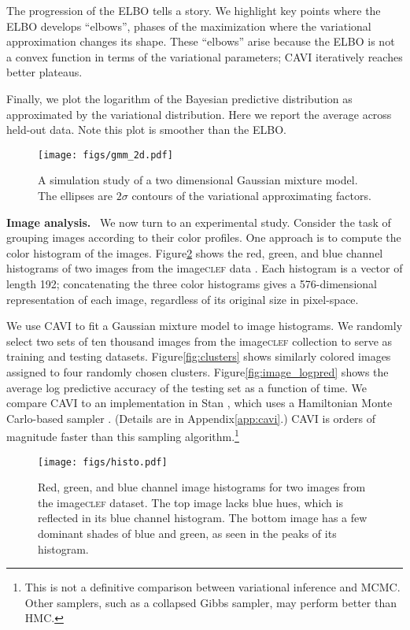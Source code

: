 \documentclass{article}
\DeclareRobustCommand{\parhead}[1]{\textbf{#1}~}
\begin{document}
The progression of the \gls{ELBO} tells a story.  We highlight key
points where the \gls{ELBO} develops ``elbows'', phases of the
maximization where the variational approximation changes its
shape. These ``elbows'' arise because the \gls{ELBO} is not a convex
function in terms of the variational parameters; \gls{CAVI} 
iteratively reaches better plateaus.

Finally, we plot the logarithm of the Bayesian predictive distribution
as approximated by the variational distribution. Here we report the
average across held-out data. Note this plot is smoother than
the \gls{ELBO}.

\begin{figure}[p]
  \centering
  \texttt{[image: figs/gmm\_2d.pdf]}
  \caption{A simulation study of a two dimensional Gaussian mixture model.
  The ellipses are $2\sigma$ contours of the variational approximating factors.}
  \label{fig:gmm_2d}
\end{figure}

\parhead{Image analysis.}  We now turn to an experimental
study. Consider the task of grouping images according to their color
profiles. One approach is to compute the color histogram of the
images. Figure\nobreakspace \ref {fig:histo} shows the red, green, and blue channel
histograms of two images from the image\textsc{clef} data
\citep{villegas13_CLEF}. Each histogram is a vector of length 192;
concatenating the three color histograms gives a 576-dimensional
representation of each image, regardless of its original size in
pixel-space.

We use \gls{CAVI} to fit a Gaussian mixture model to image
histograms. We randomly select two sets of ten thousand images from
the image\textsc{clef} collection to serve as training and testing
datasets.  Figure\nobreakspace \ref {fig:clusters} shows similarly colored images assigned
to four randomly chosen clusters.  Figure\nobreakspace \ref {fig:image_logpred} shows the
average log predictive accuracy of the testing set as a function of
time. We compare \gls{CAVI} to an implementation in Stan
\citep{stan-manual:2015}, which uses a Hamiltonian Monte Carlo-based
sampler \citep{Hoffman-Gelman:2011}. (Details are in Appendix\nobreakspace \ref {app:cavi}.)
\gls{CAVI} is orders of magnitude faster than this sampling
algorithm.\footnote{This is not a definitive comparison between
  variational inference and MCMC.  Other samplers, such as a collapsed
  Gibbs sampler, may perform better than HMC.}

\begin{figure}[htb]
  \centering
  \texttt{[image: figs/histo.pdf]}
  \caption{Red, green, and blue channel image histograms for two images from
  the image\textsc{clef} dataset. The top image lacks blue hues, which is
  reflected in its blue channel histogram. The bottom image has a few
  dominant shades of blue and green, as seen in the peaks of
  its histogram.}
  \label{fig:histo}
\end{figure}
\end{document}

